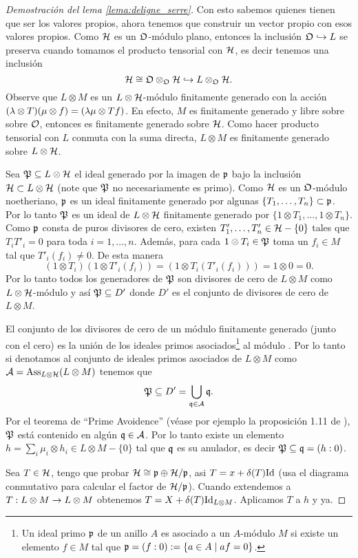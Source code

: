 \begin{proof}[Demostraci\'on del lema \ref{lema:deligne_serre}]
  Con esto sabemos quienes tienen que ser los valores propios, ahora tenemos que construir un vector propio con esos valores propios. Como $\mathcal{H}$ es un $\mathfrak{O}$-m\'odulo plano, entonces la inclusi\'on $\mathfrak{O}\hookrightarrow L$ se preserva cuando tomamos el producto tensorial con $\mathcal{H}$, es decir tenemos una inclusi\'on
  \[
    \mathcal{H}\cong\mathfrak{O}\otimes_{\mathfrak{O}}\mathcal{H}\hookrightarrow L\otimes_{\mathfrak{O}}\mathcal{H}.
  \]
Observe que $L\otimes M$ es un $L\otimes\mathcal{H}$-m\'odulo finitamente generado con la acci\'on $(\lambda\otimes T)(\mu\otimes f)=(\lambda\mu\otimes Tf)$. En efecto, $M$ es finitamente generado y libre sobre sobre $\mathcal{O}$, entonces es finitamente generado sobre $\mathcal{H}$. Como hacer producto tensorial con $L$ conmuta con la suma directa, $L\otimes M$ es finitamente generado sobre $L\otimes\mathcal{H}$.

Sea $\mathfrak{P}\subseteq L\otimes\mathcal{H}$ el ideal generado por la imagen de $\mathfrak{p}$ bajo la inclusi\'on $\mathcal{H}\subset L\otimes\mathcal{H}$ (note que $\mathfrak{P}$ no necesariamente es primo). Como $\mathcal{H}$ es un $\mathfrak{O}$-m\'odulo noetheriano, $\mathfrak{p}$ es un ideal finitamente generado por algunas $\{T_1,\dots,T_n\}\subset\mathfrak{p}$. Por lo tanto $\mathfrak{P}$ es un ideal de $L\otimes\mathcal{H}$ finitamente generado por $\{1\otimes T_1,\ldots,1\otimes T_n\}$. Como $\mathfrak{p}$ consta de puros divisores de cero, existen $T'_1,\ldots,T'_n\in\mathcal{H}-\{0\}$ tales que $T_iT'_i=0$ para toda $i=1,\ldots,n$. Adem\'as, para cada $1\otimes T_i\in\mathfrak{P}$ toma un $f_i\in M$ tal que $T'_i(f_i)\neq 0$. De esta manera
\[
  (1\otimes T_i)(1\otimes T'_i(f_i))=(1\otimes T_i(T'_i(f_i)))=1\otimes 0=0.
\]
Por lo tanto todos los generadores de $\mathfrak{P}$ son divisores de cero de $L\otimes M$ como $L\otimes\mathcal{H}$-m\'odulo y as\'i $\mathfrak{P}\subseteq D'$ donde $D'$ es el conjunto de divisores de cero de $L\otimes M$.

  El conjunto de los divisores de cero de un m\'odulo finitamente generado (junto con el cero) es la uni\'on de los ideales primos asociados\footnote{Un ideal primo $\mathfrak{p}$ de un anillo $A$ es asociado a un $A$-m\'odulo $M$ si existe un elemento $f\in M$ tal que $\mathfrak{p}=(f:0):=\{a\in A \mid af=0\}$.} al m\'odulo \cite[teorema 3.1, pg 89]{EisenbudCA}. Por lo tanto si denotamos al conjunto de ideales primos asociados de $L\otimes M$ como $\mathcal{A}=\mathrm{Ass}_{L\otimes\mathcal{H}}(L\otimes M)$ tenemos que
\[
  \mathfrak{P} \subseteq D'=\bigcup_{\mathfrak{q}\in \mathcal{A}}\mathfrak{q}.
\]
Por el teorema de ``Prime Avoidence'' (v\'ease por ejemplo la proposici\'on 1.11 de \cite{AtiyahCA}), $\mathfrak{P}$ est\'a contenido en alg\'un $\mathfrak{q}\in\mathcal{A}$. Por lo tanto existe un elemento $h=\sum_i\mu_i\otimes h_i\in L\otimes M-\{0\}$ tal que $\mathfrak{q}$ es su anulador, es decir $\mathfrak{P}\subseteq\mathfrak{q}=(h:0)$.

Sea $T\in\mathcal{H}$, tengo que probar $\mathcal{H}\cong\mathfrak{p}\oplus\mathcal{H}/\mathfrak{p}$, asi $T=x+\delta(T)\mathrm{Id}$ (usa el diagrama conmutativo para calcular el factor de $\mathcal{H}/\mathfrak{p}$). Cuando extendemos a $T:L\otimes M\rightarrow L\otimes M$ obtenemos $T=X+\delta(T)\mathrm{Id}_{L\otimes M}$. Aplicamos $T$ a $h$ y ya.
\end{proof}